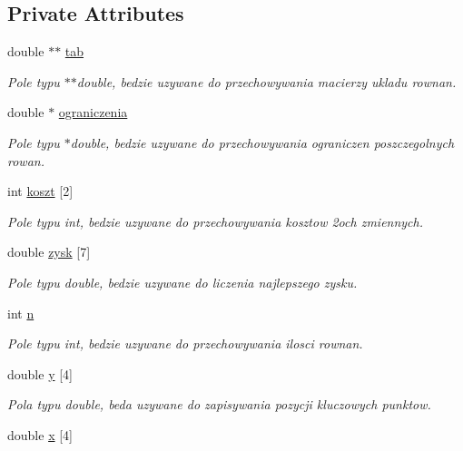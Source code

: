 \subsection*{Private Attributes}
\begin{DoxyCompactItemize}
\item 
double $\ast$$\ast$ \hyperlink{classsimplex_ac8767985af04610b7cbb310bb22a6f7c}{tab}
\begin{DoxyCompactList}\small\item\em Pole typu $\ast$$\ast$double, bedzie uzywane do przechowywania macierzy ukladu rownan. \end{DoxyCompactList}\item 
double $\ast$ \hyperlink{classsimplex_a8a31528b6dcde5dadf732e403f2910d1}{ograniczenia}
\begin{DoxyCompactList}\small\item\em Pole typu $\ast$double, bedzie uzywane do przechowywania ograniczen poszczegolnych rowan. \end{DoxyCompactList}\item 
int \hyperlink{classsimplex_adfd1d227f38ea360def13b1f15b20939}{koszt} \mbox{[}2\mbox{]}
\begin{DoxyCompactList}\small\item\em Pole typu int, bedzie uzywane do przechowywania kosztow 2och zmiennych. \end{DoxyCompactList}\item 
double \hyperlink{classsimplex_a08631fd56f6f55fb022860ee5edcbdf4}{zysk} \mbox{[}7\mbox{]}
\begin{DoxyCompactList}\small\item\em Pole typu double, bedzie uzywane do liczenia najlepszego zysku. \end{DoxyCompactList}\item 
int \hyperlink{classsimplex_a2345d5a390dc5284e4ed37d5f63ca5e8}{n}
\begin{DoxyCompactList}\small\item\em Pole typu int, bedzie uzywane do przechowywania ilosci rownan. \end{DoxyCompactList}\item 
double \hyperlink{classsimplex_abebe4828ea993bcfdb436a39123ce2c8}{y} \mbox{[}4\mbox{]}
\begin{DoxyCompactList}\small\item\em Pola typu double, beda uzywane do zapisywania pozycji kluczowych punktow. \end{DoxyCompactList}\item 
double \hyperlink{classsimplex_ac0619d7747a373ff01bf3dab3126b330}{x} \mbox{[}4\mbox{]}
\end{DoxyCompactItemize}


